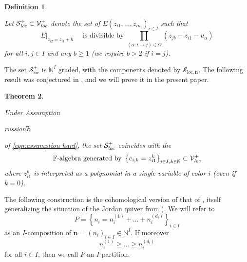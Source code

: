 \documentclass{amsart}
\newtheorem{theorem}{Theorem}[section]
\newtheorem{definition}[theorem]{Definition}
\def\BN{{\mathbb{N}}}
\def\BF{{\mathbb{F}}}
\def\CS{{\mathcal{S}}}
\def\CV{{\mathcal{V}}}
\def\nn{{\mathbb{N}^I}}
\def\bn{{\boldsymbol{n}}}
\def\edge{\Omega}
\def\field{\BF}
\def\hard{\begin{otherlanguage*}{russian}Ъ \end{otherlanguage*}}
\begin{document}
\medskip 

\begin{definition} 
\label{def:shuffle loc}

Let $\CS^+_{\emph{loc}} \subset \CV^+_{\emph{loc}}$ denote the set of $E(z_{i1},\dots,z_{in_i})_{i \in I}$ such that
\begin{equation}
\label{eqn:divisibility loc}
E\Big|_{z_{i2} = z_{i1} + \hbar} \quad \text{ is divisible by } \prod_{(\alpha : i \rightarrow j) \in \bar{\edge}} (z_{jb} - z_{i1} - u_\alpha)
\end{equation}
for all $i,j \in I$ and any $b \geq 1$ (we require $b>2$ if $i=j$).

\end{definition} 

\medskip 

\noindent The set $\CS^+_{\text{loc}}$ is $\nn$ graded, with the components denoted by $\CS_{\text{loc},\bn}$. The following result was conjectured in \cite{jindalnegutbps}, and we will prove it in the present paper.

\medskip 

\begin{theorem}
\label{thm:shuffle loc}

Under Assumption \hard of \eqref{eqn:assumption hard}, the set $\CS^+_{\emph{loc}}$ coincides with the
\begin{equation}
\label{eqn:spherical}
\field\text{-algebra generated by }\left\{ e_{i,k} = z_{i1}^k \right\}_{i \in I, k \in \BN} \subset \CV^+_{\emph{loc}}
\end{equation}
where $z_{i1}^k$ is interpreted as a polynomial in a single variable of color $i$ (even if $k=0$).

\end{theorem}

\medskip 

\noindent The following construction is the cohomological version of that of \cite{JNCoulomb}, itself generalizing the situation of the Jordan quiver from \cite{Integral}). We will refer to
\begin{equation}
\label{eqn:composition}
P = \left\{ n_i = n_i^{(1)}+\dots+n_i^{(d_i)} \right\}_{i \in I}
\end{equation}
as an $I$-composition of $\bn = (n_i)_{i \in I} \in \nn$. If moreover
$$
n_i^{(1)} \geq \dots \geq n_i^{(d_i)}
$$
for all $i \in I$, then we call $P$ an $I$-partition.

\medskip 
\end{document}
